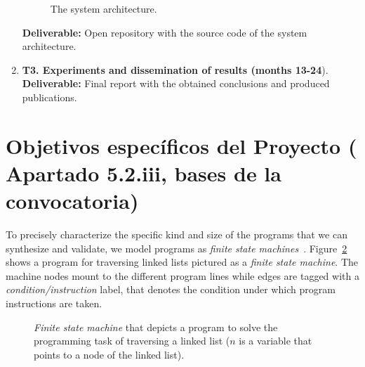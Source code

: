\documentclass[10pt,a4paper]{paper}
\begin{document}
\begin{enumerate}
\begin{figure}[hbt!]
\begin{center}
\end{center}  
\caption{\small The system architecture.}
\label{fig:architecture}
\end{figure}

{\small {\bf Deliverable:} Open repository with the source code of the system architecture.}
    
\item {\bf T3. Experiments and dissemination of results (months 13-24}). 
{\small {\bf Deliverable:} Final report with the obtained conclusions and produced publications.}
\end{enumerate}


\section{Objetivos específicos del Proyecto ( Apartado 5.2.iii, bases de la convocatoria)}
\label{subsec:objectivos}
To precisely characterize the specific kind and size of the programs that we can synthesize and validate, we model programs as {\em finite state machines}~\cite{sergio:aprograming:ijcai16}. Figure~\ref{fig:list} shows a program for traversing linked lists pictured as a {\em finite state machine}. The machine nodes mount to the different program lines while edges are tagged with a {\em condition/instruction} label, that denotes the condition under which program instructions are taken.

\begin{figure}[hbt!]
\begin{center}
\end{center}
\caption{\small {\em Finite state machine} that depicts a program to solve the programming task of traversing a linked list ($n$ is a variable that points to a node of the linked list).}
\label{fig:list}
\end{figure}
\end{document}
